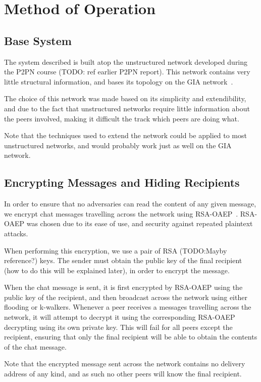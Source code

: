 \section{Method of Operation}

\subsection{Base System}

The system described is built atop the unstructured network developed during the P2PN course (TODO: ref earlier P2PN report). This network contains very little structural information, and bases its topology on the GIA network~\citep{GIA}.

The choice of this network was made based on its simplicity and extendibility, and due to the fact that unstructured networks require little information about the peers involved, making it difficult the track which peers are doing what. 

Note that the techniques used to extend the network could be applied to most unstructured networks, and would probably work just as well on the GIA network.

\subsection{Encrypting Messages and Hiding Recipients}

In order to ensure that no adversaries can read the content of any given message, we encrypt chat messages travelling across the network using RSA-OAEP~\citep{OAEP}. RSA-OAEP was chosen due to its ease of use, and security against repeated plaintext attacks.

When performing this encryption, we use a pair of RSA (TODO:Mayby reference?) keys. The sender must obtain the public key of the final recipient (how to do this will be explained later), in order to encrypt the message.

When the chat message is sent, it is first encrypted by RSA-OAEP using the public key of the recipient, and then broadcast across the network using either flooding or k-walkers. Whenever a peer receives a messages travelling across the network, it will attempt to decrypt it using the corresponding RSA-OAEP decrypting using its own private key. This will fail for all peers except the recipient, ensuring that only the final recipient will be able to obtain the contents of the chat message.

Note that the encrypted message sent across the network contains no delivery address of any kind, and as such no other peers will know the final recipient.

